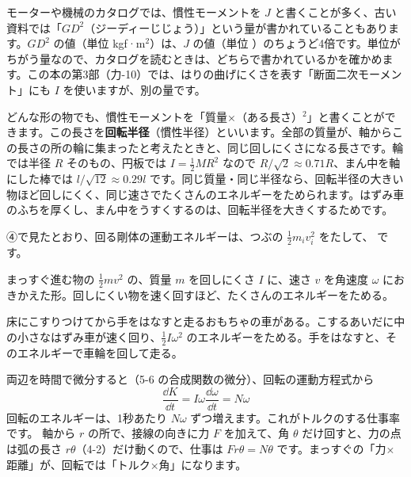 \begin{seikaku}
モーターや機械のカタログでは、慣性モーメントを $J$ と書くことが多く、古い資料では「$GD^2$（ジーディーじじょう）」という量が書かれていることもあります。$GD^2$ の値（単位 kgf·m$^2$）は、$J$ の値（単位 ）のちょうど4倍です。単位がちがう量なので、カタログを読むときは、どちらで書かれているかを確かめます。この本の第3部（力-10）では、はりの曲げにくさを表す「断面二次モーメント」にも $I$ を使いますが、別の量です。
\end{seikaku}

\begin{motto}[4]
どんな形の物でも、慣性モーメントを「質量×（ある長さ）$^2$」と書くことができます。この長さを\textbf{回転半径}（慣性半径）といいます。全部の質量が、軸からこの長さの所の輪に集まったと考えたときと、同じ回しにくさになる長さです。輪では半径 $R$ そのもの、円板では $I=\tfrac{1}{2}MR^2$ なので $R/\sqrt2\approx0.71R$、まん中を軸にした棒では $l/\sqrt{12}\approx0.29l$ です。同じ質量・同じ半径なら、回転半径の大きい物ほど回しにくく、同じ速さでたくさんのエネルギーをためられます。はずみ車のふちを厚くし、まん中をうすくするのは、回転半径を大きくするためです。
\end{motto}


\leavevmode\label{ph:力-6:sec8}④で見たとおり、回る剛体の運動エネルギーは、つぶの $\tfrac{1}{2}m_iv_i^2$ をたして、\label{ph:力-6:energy}
です。
\begin{phyomi}[$K=\tfrac{1}{2}I\omega^2$]
まっすぐ進む物の $\tfrac{1}{2}mv^2$ の、質量 $m$ を回しにくさ $I$ に、速さ $v$ を角速度 $\omega$ におきかえた形。回しにくい物を速く回すほど、たくさんのエネルギーをためる。
\end{phyomi}
\begin{phmijika}[はずみ車で走るおもちゃの車]
床にこすりつけてから手をはなすと走るおもちゃの車がある。こするあいだに中の小さなはずみ車が速く回り、$\tfrac{1}{2}I\omega^2$ のエネルギーをためる。手をはなすと、そのエネルギーで車輪を回して走る。
\end{phmijika}両辺を時間で微分すると（5-6 の合成関数の微分）、回転の運動方程式から
\[ \frac{\dd K}{\dd t}=I\omega\frac{\dd\omega}{\dd t}=N\omega \]
回転のエネルギーは、1秒あたり $N\omega$ ずつ増えます。これがトルクのする仕事率です。
\noindent 軸から $r$ の所で、接線の向きに力 $F$ を加えて、角 $\theta$ だけ回すと、力の点は弧の長さ $r\theta$（4-2）だけ動くので、仕事は $Fr\theta=N\theta$ です。まっすぐの「力×距離」が、回転では「トルク×角」になります。

